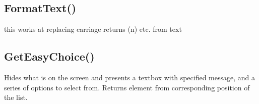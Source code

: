 \documentclass[letterpaper,10pt,english]{sphinxmanual}
\begin{document}
\ignorespaces 

\subsection{FormatText()}
\label{\detokenize{reference/utility:formattext}}\label{\detokenize{reference/utility:index-12}}
\sphinxAtStartPar
{}

\sphinxAtStartPar
this works at replacing carriage returns (n) etc. from text

\sphinxAtStartPar
{}

\begin{sphinxVerbatim}[commandchars=\\\{\}]
\end{sphinxVerbatim}

\ignorespaces 

\subsection{GetEasyChoice()}
\label{\detokenize{reference/utility:geteasychoice}}\label{\detokenize{reference/utility:index-13}}
\sphinxAtStartPar
{}

\sphinxAtStartPar
{}

\sphinxAtStartPar
Hides what is on the screen and presents a textbox with   specified message, and a series of options to select from. Returns element from corresponding position of the  list.

\sphinxAtStartPar
{}

\begin{sphinxVerbatim}[commandchars=\\\{\}]
\end{sphinxVerbatim}

\sphinxAtStartPar
{}
\end{document}
